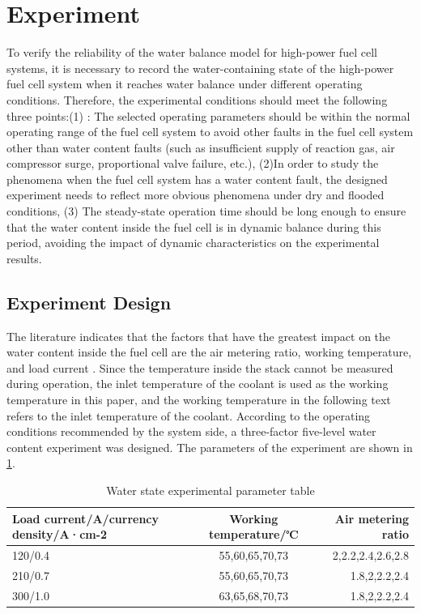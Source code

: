 \section{Experiment}
To verify the reliability of the water balance model for high-power fuel cell systems, it is necessary to record the water-containing state of the high-power fuel cell system when it reaches water balance under different operating conditions. Therefore, the experimental conditions should meet the following three points:(1) : The selected operating parameters should be within the normal operating range of the fuel cell system to avoid other faults in the fuel cell system other than water content faults (such as insufficient supply of reaction gas, air compressor surge, proportional valve failure, etc.), (2)In order to study the phenomena when the fuel cell system has a water content fault, the designed experiment needs to reflect more obvious phenomena under dry and flooded conditions, (3) The steady-state operation time should be long enough to ensure that the water content inside the fuel cell is in dynamic balance during this period, avoiding the impact of dynamic characteristics on the experimental results.
\subsection{Experiment Design}
The literature indicates that the factors that have the greatest impact on the water content inside the fuel cell are the air metering ratio, working temperature, and load current \cite{legrosFirstResultsPEMFC2011}. Since the temperature inside the stack cannot be measured during operation, the inlet temperature of the coolant is used as the working temperature in this paper, and the working temperature in the following text refers to the inlet temperature of the coolant. According to the operating conditions recommended by the system side, a three-factor five-level water content experiment was designed. The parameters of the experiment are shown in \ref{tab:WaterStateExperimentalParameterTable}.
\begin{table}
	\centering
	\begin{center}
		\caption{Water state experimental parameter table}
		\label{tab:WaterStateExperimentalParameterTable}
		\begin{tabular}{l|c|r}
			\hline
			\textbf{Load current/A/currency density/A·cm-2} & \textbf{Working temperature/℃} & \textbf{Air metering ratio} \\
			\hline
			120/0.4                                         & 55,60,65,70,73                 & 2,2.2,2.4,2.6,2.8           \\
			210/0.7                                         & 55,60,65,70,73                 & 1.8,2,2.2,2.4               \\
			300/1.0                                         & 63,65,68,70,73                 & 1.8,2,2.2,2.4               \\
			\hline
		\end{tabular}
	\end{center}
\end{table}

